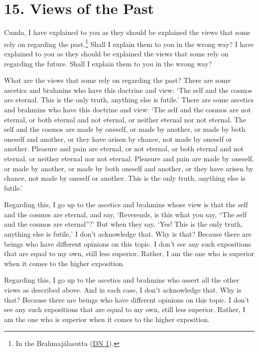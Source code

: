 \documentclass[12pt,openany]{book}%
\begin{document}
\section*{15. Views of the Past }

Cunda, I have explained to you as they should be explained the views that some rely on regarding the past.\footnote{In the \textsanskrit{Brahmajālasutta} (\href{https://suttacentral.net/dn1/en/sujato}{DN 1}). } Shall I explain them to you in the wrong way? I have explained to you as they should be explained the views that some rely on regarding the future. Shall I explain them to you in the wrong way? 

What are the views that some rely on regarding the past? There are some ascetics and brahmins who have this doctrine and view: ‘The self and the cosmos are eternal. This is the only truth, anything else is futile.’ There are some ascetics and brahmins who have this doctrine and view: ‘The self and the cosmos are not eternal, or both eternal and not eternal, or neither eternal nor not eternal. The self and the cosmos are made by oneself, or made by another, or made by both oneself and another, or they have arisen by chance, not made by oneself or another. Pleasure and pain are eternal, or not eternal, or both eternal and not eternal, or neither eternal nor not eternal. Pleasure and pain are made by oneself, or made by another, or made by both oneself and another, or they have arisen by chance, not made by oneself or another. This is the only truth, anything else is futile.’ 

Regarding this, I go up to the ascetics and brahmins whose view is that the self and the cosmos are eternal, and say, ‘Reverends, is this what you say, “The self and the cosmos are eternal”?’ But when they say, ‘Yes! This is the only truth, anything else is futile,’ I don’t acknowledge that. Why is that? Because there are beings who have different opinions on this topic. I don’t see any such expositions that are equal to my own, still less superior. Rather, I am the one who is superior when it comes to the higher exposition. 

Regarding this, I go up to the ascetics and brahmins who assert all the other views as described above. And in each case, I don’t acknowledge that. Why is that? Because there are beings who have different opinions on this topic. I don’t see any such expositions that are equal to my own, still less superior. Rather, I am the one who is superior when it comes to the higher exposition. 
\end{document}

